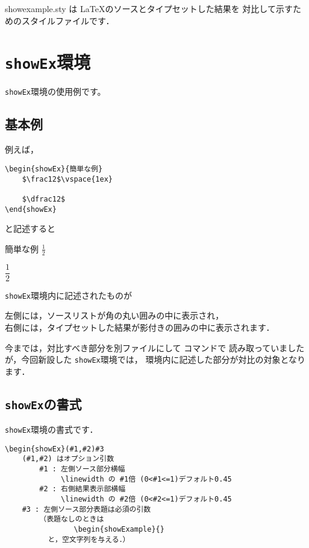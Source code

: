 \documentclass{jarticle}
\begin{document}
\textsf{showexample.sty} は \LaTeX のソースとタイプセットした結果を
対比して示すためのスタイルファイルです．
\section{\texttt{showEx}環境}
\texttt{showEx}環境の使用例です。
\subsection{基本例}
例えば，
\begin{dblbox}
\begin{verbatim}
\begin{showEx}{簡単な例}
    $\frac12$\vspace{1ex}
    
    $\dfrac12$
\end{showEx}
\end{verbatim}
\end{dblbox}
と記述すると
\begin{showEx}{簡単な例}
    $\frac12$\vspace{1ex}

    $\dfrac12$
\end{showEx}
\texttt{showEx}環境内に記述されたものが
\begin{jquote}
左側には，ソースリストが角の丸い囲みの中に表示され，\\
右側には，タイプセットした結果が影付きの囲みの中に表示されます．
\end{jquote}
今までは，対比すべき部分を別ファイルにして  コマンドで
読み取っていましたが，今回新設した \texttt{showEx}環境では，
環境内に記述した部分が対比の対象となります．
\clearpage

\subsection{\texttt{showEx}の書式}
\texttt{showEx}環境の書式です．
\begin{boxnote}
\begin{verbatim}
\begin{showEx}(#1,#2)#3
    (#1,#2) はオプション引数
        #1 : 左側ソース部分横幅
             \linewidth の #1倍 (0<#1<=1)デフォルト0.45
        #2 : 右側結果表示部横幅 
             \linewidth の #2倍 (0<#2<=1)デフォルト0.45
    #3 : 左側ソース部分表題は必須の引数
        （表題なしのときは
                \begin{showExample}{}
          と，空文字列を与える．）
\end{verbatim}
\end{boxnote}
\end{document}
